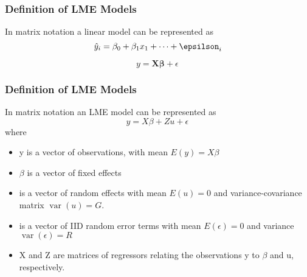 
\begin{frame}
\frametitle{Definition of LME Models}

In matrix notation a linear model can be represented as
\[ \hat{y}_i = \beta_0 + \beta_1x_1 + \dots + \epsilson_i\]


\[ y = \boldsymbol{X} \boldsymbol{\beta}  + \epsilon\,\]
\end{frame}
\begin{frame}
\frametitle{Definition of LME Models}

In matrix notation an LME model can be represented as
\[ y = X \beta + Zu + \epsilon\,\]
where
\begin{itemize}
\item y is a vector of observations, with mean $E(y)=X\beta$
\item $\beta$ is a vector of fixed effects
\item {} is a vector of random effects with mean $E(u)=0$ and variance-covariance matrix 
$\operatorname{var}(u)=G$.
\item \epsilon is a vector of IID random error terms with mean $E(\epsilon)=0$ and variance 
$\operatorname{var}(\epsilon)=R$
\item X and Z are matrices of regressors relating the observations y to $\beta$ and u, respectively.
\end{itemize}
\end{frame}


